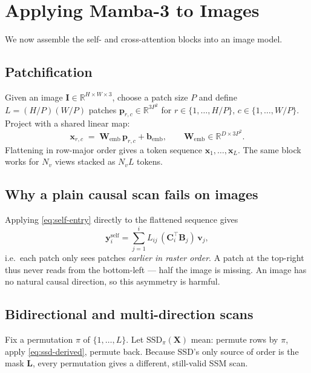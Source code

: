 \documentclass[11pt,a4paper]{article}
\begin{document}
\section{Applying Mamba-3 to Images}
\label{sec:images}

We now assemble the self- and cross-attention blocks into an image
model.

\subsection{Patchification}

Given an image $\bm{I}\in\mathbb{R}^{H\times W\times 3}$, choose a
patch size $P$ and define $L = (H/P)(W/P)$ patches
$\bm{p}_{r,c}\in\mathbb{R}^{3P^2}$ for
$r\in\{1,\dots,H/P\},\,c\in\{1,\dots,W/P\}$. Project with a shared
linear map:
\begin{equation}\label{eq:patch-embed}
  \bm{x}_{r,c} \;=\; \bm{W}_{\text{emb}}\,\bm{p}_{r,c} + \bm{b}_{\text{emb}},
  \qquad \bm{W}_{\text{emb}}\in\mathbb{R}^{D\times 3P^2}.
\end{equation}
Flattening in row-major order gives a token sequence
$\bm{x}_1,\dots,\bm{x}_L$. The same block works for $N_v$ views
stacked as $N_v L$ tokens.

\subsection{Why a plain causal scan fails on images}

Applying \eqref{eq:self-entry} directly to the flattened sequence
gives
\begin{equation}
  \bm{y}_i^{\text{self}} = \sum_{j=1}^{i} L_{ij}\,(\bm{C}_i^\top\bm{B}_j)\,\bm{v}_j,
\end{equation}
i.e.\ each patch only sees patches \emph{earlier in raster order}.
A patch at the top-right thus never reads from the bottom-left — half
the image is missing. An image has no natural causal direction, so
this asymmetry is harmful.

\subsection{Bidirectional and multi-direction scans}
\label{sec:bidi}

Fix a permutation $\pi$ of $\{1,\dots,L\}$. Let
$\mathrm{SSD}_\pi(\bm{X})$ mean: permute rows by $\pi$, apply
\eqref{eq:ssd-derived}, permute back. Because SSD's only source of
order is the mask $\bm{L}$, every permutation gives a different,
still-valid SSM scan.
\end{document}
